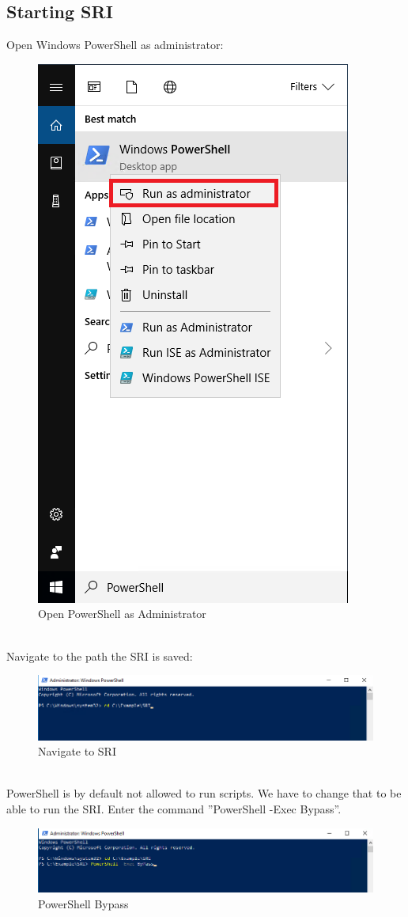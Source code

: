 
\thispagestyle{plain}
\renewcommand\section{\stdsection}
\setcounter{section}{4}
\subsection{Starting SRI}
Open Windows PowerShell as administrator:

\begin{figure}[H]
    \centering
    \includegraphics[width=0.35\linewidth]{../user_manual/assets/ps_admin.png}
    \caption{Open PowerShell as Administrator}
\end{figure} \ \\
Navigate to the path the SRI is saved:
\begin{figure}[H]
    \centering
    \includegraphics[width=1\linewidth]{../user_manual/assets/open_sri.png}
    \caption{Navigate to SRI}
\end{figure} \ \\
PowerShell is by default not allowed to run scripts. We have to change that to be able to run the SRI. Enter the command ''PowerShell -Exec Bypass''.
\begin{figure}[H]
    \centering
    \includegraphics[width=1\linewidth]{../user_manual/assets/ps_bypass.png}
    \caption{PowerShell Bypass}
\end{figure} \ \\

